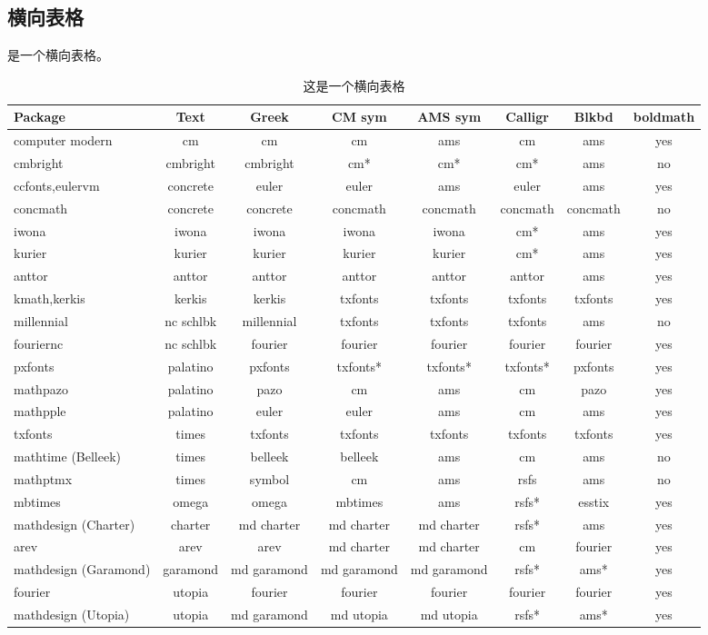 \subsection{横向表格}
 是一个横向表格。
\begin{landscape} 
	\begin{table}
		\caption{这是一个横向表格}\label{tbl:landscapetable}
		\begin{tabular}{lccccccc}
			\toprule
			Package&Text&Greek&CM sym&AMS sym&Calligr&Blkbd&boldmath\\
			\midrule
			computer modern&cm&cm&cm&ams&cm&ams&yes\\
			cmbright&cmbright&cmbright&cm*&cm*&cm*&ams&no\\
			ccfonts,eulervm&concrete&euler&euler&ams&euler&ams&yes\\
			concmath&concrete&concrete&concmath&concmath&concmath&concmath&no\\
			iwona&iwona&iwona&iwona&iwona&cm*&ams&yes\\
			kurier&kurier&kurier&kurier&kurier&cm*&ams&yes\\
			anttor&anttor&anttor&anttor&anttor&anttor&ams&yes\\
			kmath,kerkis&kerkis&kerkis&txfonts&txfonts&txfonts&txfonts&yes\\
			millennial&nc schlbk&millennial&txfonts&txfonts&txfonts&ams&no\\
			fouriernc&nc schlbk&fourier&fourier&fourier&fourier&fourier&yes\\
			pxfonts&palatino&pxfonts&txfonts*&txfonts*&txfonts*&pxfonts&yes\\
			mathpazo&palatino&pazo&cm&ams&cm&pazo&yes\\
			mathpple&palatino&euler&euler&ams&cm&ams&yes\\
			txfonts&times&txfonts&txfonts&txfonts&txfonts&txfonts&yes\\
			mathtime (Belleek)&times&belleek&belleek&ams&cm&ams&no\\
			mathptmx&times&symbol&cm&ams&rsfs&ams&no\\
			mbtimes&omega&omega&mbtimes&ams&rsfs*&esstix&yes\\
			mathdesign (Charter)&charter&md charter&md charter&md charter& rsfs* &ams&yes\\
			arev&arev&arev&md charter&md charter&cm&fourier&yes\\
			mathdesign (Garamond)&garamond&md garamond&md garamond&md garamond& rsfs* & ams* &yes\\
			fourier&utopia&fourier&fourier&fourier&fourier&fourier&yes\\
			mathdesign (Utopia)&utopia&md garamond&md utopia&md utopia&rsfs*&ams*&yes\\
			\bottomrule
		\end{tabular}
	\end{table}
\end{landscape} 


